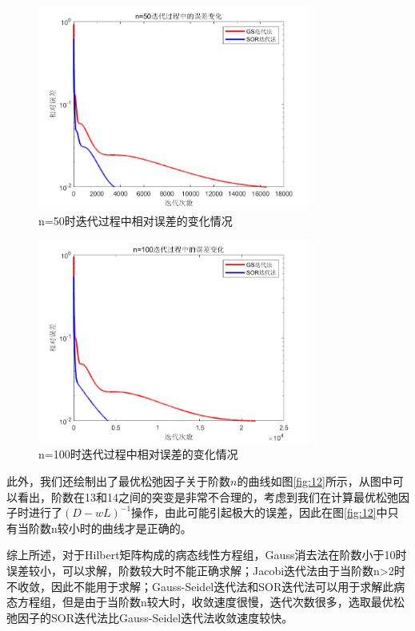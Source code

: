 \documentclass[a4paper]{article}
\begin{document}
\begin{figure}[!h]
	\centering
	\includegraphics[width=0.8\textwidth]{../code/result/er50}
	\caption{\label{fig:10}n=50时迭代过程中相对误差的变化情况}
\end{figure}

\begin{figure}[!h]
	\centering
	\includegraphics[width=0.8\textwidth]{../code/result/er100}
	\caption{\label{fig:11}n=100时迭代过程中相对误差的变化情况}
\end{figure}

此外，我们还绘制出了最优松弛因子关于阶数$n$的曲线如图\ref{fig:12}所示，从图中可以看出，阶数在13和14之间的突变是非常不合理的，考虑到我们在计算最优松弛因子时进行了$(D-wL)^{-1}$操作，由此可能引起极大的误差，因此在图\ref{fig:12}中只有当阶数n较小时的曲线才是正确的。

综上所述，对于Hilbert矩阵构成的病态线性方程组，Gauss消去法在阶数小于10时误差较小，可以求解，阶数较大时不能正确求解；Jacobi迭代法由于当阶数n>2时不收敛，因此不能用于求解；Gauss-Seidel迭代法和SOR迭代法可以用于求解此病态方程组，但是由于当阶数n较大时，收敛速度很慢，迭代次数很多，选取最优松弛因子的SOR迭代法比Gauss-Seidel迭代法收敛速度较快。
\end{document}
